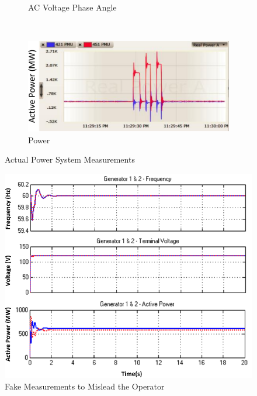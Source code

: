 \begin{figure}[tp]
\begin{subfigure}[b]{0.42\textwidth}
        \vspace{-0.15in}
        \caption{AC Voltage Phase Angle}
		\label{fig:attack1-3}
	\end{subfigure}
~\qquad
	\begin{subfigure}[b]{0.42\textwidth}
    	\centering
	\includegraphics[width=1\textwidth]{figures/attack1-5}
        \vspace{-0.15in}
        \caption{Power}
		\label{fig:attack1-5}
	\end{subfigure}
    \vspace{-0.15in}
	\caption{Actual Power System Measurements}
	\vspace{-0.15in}
    \label{fig:attack1}
\end{figure}

\begin{figure}[tp]
  \centering
  \includegraphics[width=.47\textwidth]{figures/attack1-fake}
  \vspace{-0.1in}
  \caption{Fake Measurements to Mislead the Operator}
  \vspace{-0.25in}
  \label{fig:attack1-fake}
\end{figure}


